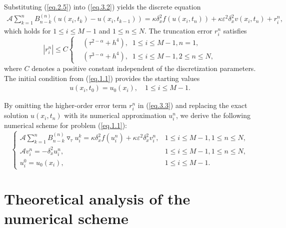 \documentclass{siamart171218}
\theoremstyle{remark}
\theoremstyle{example}
\numberwithin{equation}{section}
\begin{document}
Substituting (\ref{eq.2.5}) into (\ref{eq.3.2}) yields the discrete equation
\begin{equation}\label{eq.3.3}
\begin{aligned}
\mathscr{A} \sum_{k=1}^{n}B_{n-k}^{(n)} \left(u(x_i,t_k)-u(x_i,t_{k-1}) \right) = \kappa \delta_x^2 f(u(x_i,t_{n})) + \kappa \varepsilon^2 \delta_x^2 v(x_i,t_{n}) + r_{i}^{n},
\end{aligned}
\end{equation}
which holds for $1\leq i \leq M-1$ and $1\leq n \leq N$. The truncation error $r_i^n$ satisfies
\begin{equation}\label{eq.3.4}
\left|r_{i}^{n}\right| \leq C \left\{
\begin{aligned}
& \left(\tau^{2-\alpha}+h^4\right), \;\; 1\leq i \leq M-1, n=1, \\
& \left(\tau^{3-\alpha}+h^4\right), \;\; 1\leq i \leq M-1, 2\leq n \leq N,
\end{aligned}
\right.
\end{equation}
where $C$ denotes a positive constant
independent of the discretization parameters.
The initial condition from (\ref{eq.1.1})
provides the starting values
\begin{align*}
u(x_i,t_{0}) = u_0(x_i), \quad 1\leq i \leq M-1.
\end{align*}

By omitting the higher-order error term $r_{i}^{n}$ in (\ref{eq.3.3}) and replacing the exact solution $u(x_i,t_n)$ with its numerical approximation $u_{i}^n$, we derive the following numerical scheme for problem (\ref{eq.1.1}):
\begin{equation}\label{eq.3.5}
\begin{cases}\displaystyle
\mathscr{A} \sum\limits_{k=1}^{n}B_{n-k}^{(n)}
\triangledown_\tau u_i^k = \kappa \delta_x^2 f(u_i^n)
+ \kappa \varepsilon^2 \delta_x^2 v_i^n, & 1\leq i \leq M-1, 1\leq n \leq N, \\
\mathscr{A} v_i^n = -\delta_x^2 u_i^n, & 1\leq i \leq M-1, 1\leq n \leq N, \\
u_{i}^{0} = u_0(x_i), & 1\leq i \leq M-1.
\end{cases}
\end{equation}



\section{Theoretical analysis of the numerical scheme}
\label{sec:theoretical-analysis}
\end{document}
